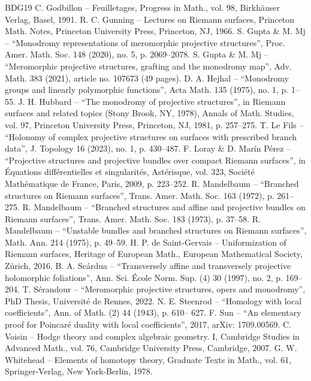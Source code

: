 \begin{thebibliography}{BDG19}
 C. Godbillon – Feuilletages, Progress in Math., vol. 98, Birkhäuser Verlag, Basel, 1991.
 R. C. Gunning – Lectures on Riemann surfaces, Princeton Math. Notes, Princeton University Press, Princeton, NJ, 1966.
 S. Gupta \& M. Mj – “Monodromy representations of meromorphic projective structures”, Proc. Amer. Math. Soc. 148 (2020), no. 5, p. 2069–2078.
 S. Gupta \& M. Mj – “Meromorphic projective structures, grafting and the monodromy map”, Adv. Math. 383 (2021), article no. 107673 (49 pages).
 D. A. Hejhal – “Monodromy groups and linearly polymorphic functions”, Acta Math. 135 (1975), no. 1, p. 1–55.
 J. H. Hubbard – “The monodromy of projective structures”, in Riemann surfaces and related topics (Stony Brook, NY, 1978), Annals of Math. Studies, vol. 97, Princeton University Press, Princeton, NJ, 1981, p. 257–275.
 T. Le Fils – “Holonomy of complex projective structures on surfaces with prescribed branch data”, J. Topology 16 (2023), no. 1, p. 430–487.
 F. Loray \& D. Marín Pérez – “Projective structures and projective bundles over compact Riemann surfaces”, in Équations différentielles et singularités, Astérisque, vol. 323, Société Mathématique de France, Paris, 2009, p. 223–252.
 R. Mandelbaum – “Branched structures on Riemann surfaces”, Trans. Amer. Math. Soc. 163 (1972), p. 261–275.
 R. Mandelbaum – “Branched structures and affine and projective bundles on Riemann surfaces”, Trans. Amer. Math. Soc. 183 (1973), p. 37–58.
 R. Mandelbaum – “Unstable bundles and branched structures on Riemann surfaces”, Math. Ann. 214 (1975), p. 49–59.
 H. P. de Saint-Gervais – Uniformization of Riemann surfaces, Heritage of European Math., European Mathematical Society, Zürich, 2016.
 B. A. Scárdua – “Transversely affine and transversely projective holomorphic foliations”, Ann. Sci. École Norm. Sup. (4) 30 (1997), no. 2, p. 169–204.
 T. Sérandour – “Meromorphic projective structures, opers and monodromy”, PhD Thesis, Université de Rennes, 2022.
 N. E. Steenrod – “Homology with local coefficients”, Ann. of Math. (2) 44 (1943), p. 610– 627.
 F. Sun – “An elementary proof for Poincaré duality with local coefficients”, 2017, arXiv: 1709.00569.
 C. Voisin – Hodge theory and complex algebraic geometry. I, Cambridge Studies in Advanced Math., vol. 76, Cambridge University Press, Cambridge, 2007.
 G. W. Whitehead – Elements of homotopy theory, Graduate Texts in Math., vol. 61, Springer-Verlag, New York-Berlin, 1978.
\end{thebibliography}
